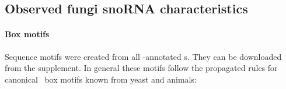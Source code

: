 %

\subsection{Observed fungi snoRNA characteristics}

\paragraph{\textbf{Box motifs}} Sequence motifs were created from all
\snostrip-annotated \sno s. They can be downloaded from the
supplement.  In general these motifs follow the propagated rules for
canonical \sno\ box motifs known from yeast and animals:

